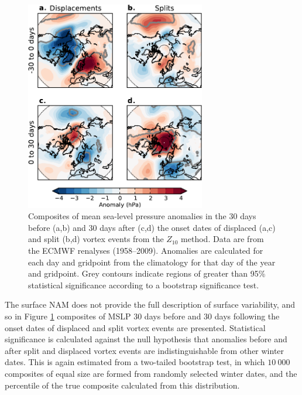 \begin{figure}
 \centering
 \noindent\includegraphics[width=0.7\textwidth]{figures/chapter-moments/mslp_composites_colbar_crop.pdf}
 \caption[Mean sea-level pressure composites for split and displaced vortex
 events.]{Composites of mean sea-level pressure anomalies in the 30 days before
   (a,b) and 30 days after (c,d) the onset dates of displaced (a,c) and split
   (b,d) vortex events from the $Z_{10}$ method. Data are from the ECMWF
   renalyses (1958--2009). Anomalies are calculated for each day and gridpoint
   from the climatology for that day of the year and gridpoint. Grey contours
   indicate regions of greater than 95\% statistical significance according to a
   bootstrap significance test.}
 \label{fig:mslp_composites}
\end{figure}

The surface NAM does not provide the full description of surface variability,
and so in Figure \ref{fig:mslp_composites} composites of MSLP 30 days before and
30 days following the onset dates of displaced and split vortex events are
presented. Statistical significance is calculated against the null hypothesis
that anomalies before and after split and displaced vortex events are
indistinguishable from other winter dates. This is again estimated from a
two-tailed bootstrap test, in which $10~000$ composites of equal size are formed
from randomly selected winter dates, and the percentile of the true composite
calculated from this distribution.

